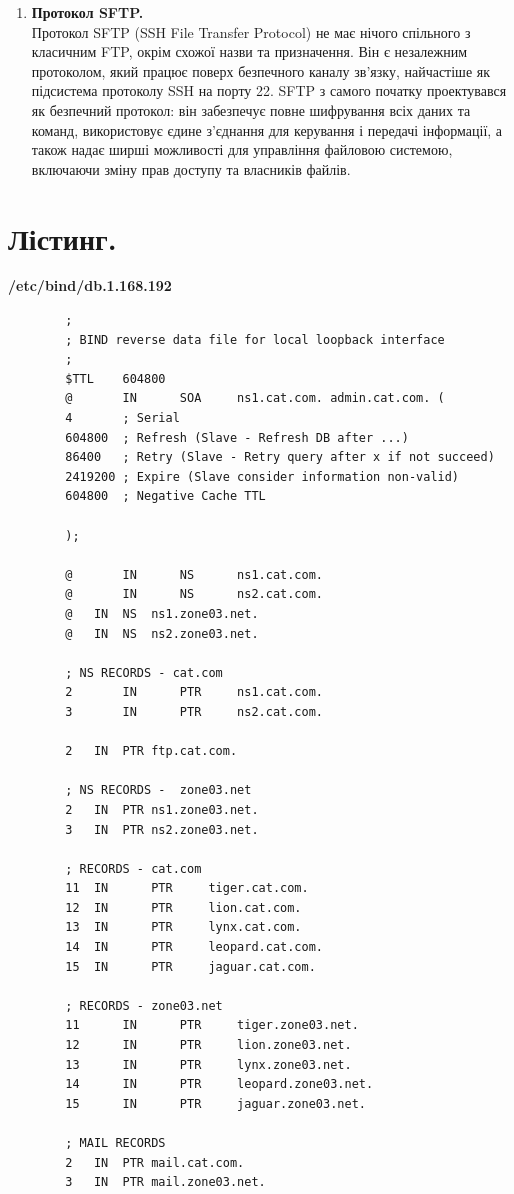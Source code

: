 \documentclass[14pt, a4paper]{extreport}
\begin{document}
\begin{enumerate}
		\item \textbf{Протокол SFTP.} \\ Протокол SFTP (SSH File Transfer Protocol) не має нічого спільного з класичним FTP, окрім схожої назви та призначення. Він є незалежним протоколом, який працює поверх безпечного каналу зв'язку, найчастіше як підсистема протоколу SSH на порту 22. SFTP з самого початку проектувався як безпечний протокол: він забезпечує повне шифрування всіх даних та команд, використовує єдине з'єднання для керування і передачі інформації, а також надає ширші можливості для управління файловою системою, включаючи зміну прав доступу та власників файлів.
	\end{enumerate}
	
	\pagebreak
	
	\section*{Лістинг.}
	
	\textbf{/etc/bind/db.1.168.192}
	
	\begin{verbatim} 
		;
		; BIND reverse data file for local loopback interface
		;
		$TTL    604800
		@       IN      SOA     ns1.cat.com. admin.cat.com. (
		4       ; Serial
		604800  ; Refresh (Slave - Refresh DB after ...)
		86400   ; Retry (Slave - Retry query after x if not succeed)
		2419200 ; Expire (Slave consider information non-valid)
		604800  ; Negative Cache TTL
		
		);
		
		@       IN      NS      ns1.cat.com.
		@       IN      NS      ns2.cat.com.
		@	IN	NS	ns1.zone03.net.
		@	IN	NS	ns2.zone03.net.
		
		; NS RECORDS - cat.com
		2     	IN      PTR     ns1.cat.com.
		3     	IN      PTR     ns2.cat.com.
		
		2	IN	PTR	ftp.cat.com.
		
		; NS RECORDS -  zone03.net 
		2	IN	PTR	ns1.zone03.net.
		3	IN	PTR	ns2.zone03.net.
		
		; RECORDS - cat.com
		11	IN      PTR     tiger.cat.com.
		12	IN      PTR     lion.cat.com.
		13	IN      PTR     lynx.cat.com.
		14	IN      PTR     leopard.cat.com.
		15	IN      PTR     jaguar.cat.com.
		
		; RECORDS - zone03.net
		11      IN      PTR     tiger.zone03.net.
		12      IN      PTR     lion.zone03.net.
		13      IN      PTR     lynx.zone03.net.
		14      IN      PTR     leopard.zone03.net.
		15      IN      PTR     jaguar.zone03.net.
		
		; MAIL RECORDS
		2	IN	PTR	mail.cat.com.
		3	IN	PTR	mail.zone03.net.
	\end{verbatim}
	
\end{document}
